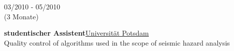 \documentclass{article}
\begin{document}
\begin{minipage}[t]{0.65\textwidth}
		\begin{minipage}[t]{0.3\textwidth}
		03/2010 - 05/2010 \\ (3 Monate)
		\end{minipage}
		\hfill
		\begin{minipage}[t]{0.7\textwidth}
		\textbf{studentischer Assistent}\hfill \href{https://www.uni-potsdam.de/}{\color{pblue}Universität Potsdam}\\
	    Quality control of algorithms used in the scope of seismic hazard analysis
		\end{minipage}
\end{minipage}
\end{document}
